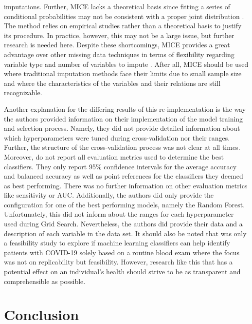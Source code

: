 imputations. Further, MICE lacks a theoretical basis since fitting a series of 
conditional probabilities may not be consistent with a proper joint 
distribution 
\cite{RN141}. The method relies on empirical studies rather than a theoretical 
basis to justify its procedure. In practice, however, this may not be a large 
issue, but further research is needed here. Despite these shortcomings, MICE 
provides a great advantage over other missing data techniques in terms of 
flexibility regarding variable type and number of variables to impute 
\cite{RN141, RN142}. After all, MICE should be used where traditional 
imputation methods face their limits due to small sample size and where the 
characteristics of the variables and their relations are still recognizable.
\par
Another explanation for the differing results of this re-implementation is the 
way the authors provided information on their implementation of the model 
training and selection process. Namely, they did not provide detailed 
information about which hyperparameters were tuned during cross-validation nor 
their ranges. Further, the structure of the cross-validation process was not 
clear at all times.
\\
Moreover, \citeauthor{RN127} do not report all evaluation metrics used to 
determine the best classifiers. They only report 95\% confidence intervals for 
the average accuracy and balanced accuracy as well as point references for the 
classifiers they deemed as best performing. There was no further information 
on other evaluation metrics like sensitivity or AUC. Additionally, the authors 
did only provide the configuration for one of the best performing models, 
namely the Random Forest. Unfortunately, this did not inform about the ranges 
for each hyperparameter used during Grid Search.
Nevertheless, the authors did provide their data and a description of each 
variable in the data set. It should also be noted that \cite{RN127} was only a 
feasibility study to explore if machine learning classifiers can help identify 
patients with COVID-19 solely based on a routine blood exam where the focus was 
not on replicability but feasibility. However, research like this that has a 
potential effect on an individual's health should strive to be as transparent 
and comprehensible as possible.
\section{Conclusion}
